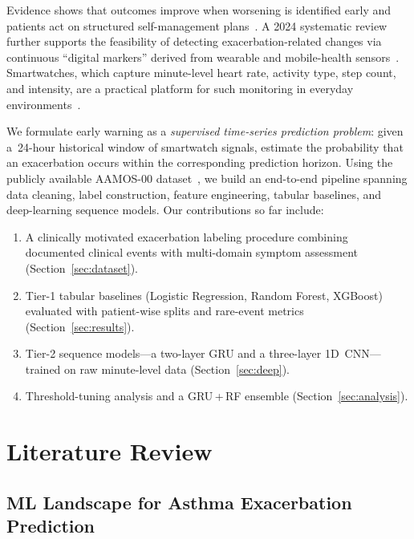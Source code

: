 \documentclass[11pt,a4paper]{article}
\begin{document}
Evidence shows that outcomes improve when worsening is identified early and
patients act on structured self-management plans~\cite{pinnock2015}.  A 2024
systematic review further supports the feasibility of detecting
exacerbation-related changes via continuous ``digital markers'' derived from
wearable and mobile-health sensors~\cite{cokorudy2024}.  Smartwatches, which
capture minute-level heart rate, activity type, step count, and intensity, are a
practical platform for such monitoring in everyday
environments~\cite{taylor2020}.

We formulate early warning as a \emph{supervised time-series prediction
problem}: given a~24-hour historical window of smartwatch signals, estimate the
probability that an exacerbation occurs within the corresponding prediction
horizon.  Using the publicly available AAMOS-00 dataset~\cite{tsang2023}, we
build an end-to-end pipeline spanning data cleaning, label construction,
feature engineering, tabular baselines, and deep-learning sequence models.  Our
contributions so far include:

\begin{enumerate}[nosep]
  \item A clinically motivated exacerbation labeling procedure combining
        documented clinical events with multi-domain symptom assessment
        (Section~\ref{sec:dataset}).
  \item Tier-1 tabular baselines (Logistic Regression, Random Forest, XGBoost)
        evaluated with patient-wise splits and rare-event metrics
        (Section~\ref{sec:results}).
  \item Tier-2 sequence models—a two-layer GRU and a three-layer 1D~CNN—trained
        on raw minute-level data (Section~\ref{sec:deep}).
  \item Threshold-tuning analysis and a GRU\,+\,RF ensemble
        (Section~\ref{sec:analysis}).
\end{enumerate}

\section{Literature Review}\label{sec:litreview}

\subsection{ML Landscape for Asthma Exacerbation Prediction}
\end{document}
